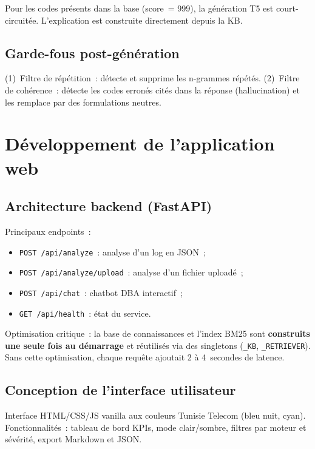\documentclass[12pt,a4paper]{report}
\begin{document}
Pour les codes pr\'esents dans la base (score~= 999), la g\'en\'eration T5 est
court-circuit\'ee. L'explication est construite directement depuis la KB.

\subsection{Garde-fous post-g\'en\'eration}

(1)~Filtre de r\'ep\'etition~: d\'etecte et supprime les n-grammes r\'ep\'et\'es.
(2)~Filtre de coh\'erence~: d\'etecte les codes erron\'es cit\'es dans la r\'eponse
(hallucination) et les remplace par des formulations neutres.

\section{D\'eveloppement de l'application web}

\subsection{Architecture backend (FastAPI)}

Principaux endpoints~:
\begin{itemize}[leftmargin=*]
  \item \texttt{POST /api/analyze}~: analyse d'un log en JSON~;
  \item \texttt{POST /api/analyze/upload}~: analyse d'un fichier upload\'e~;
  \item \texttt{POST /api/chat}~: chatbot DBA interactif~;
  \item \texttt{GET /api/health}~: \'etat du service.
\end{itemize}

Optimisation critique~: la base de connaissances et l'index BM25 sont
\textbf{construits une seule fois au d\'emarrage} et r\'eutilis\'es via des
singletons (\texttt{\_KB}, \texttt{\_RETRIEVER}). Sans cette optimisation, chaque
requ\^ete ajoutait 2 \`a 4~secondes de latence.

\subsection{Conception de l'interface utilisateur}

Interface HTML/CSS/JS vanilla aux couleurs Tunisie Telecom (bleu nuit, cyan).
Fonctionnalit\'es~: tableau de bord KPIs, mode clair/sombre, filtres par moteur
et s\'ev\'erit\'e, export Markdown et JSON.
\end{document}
